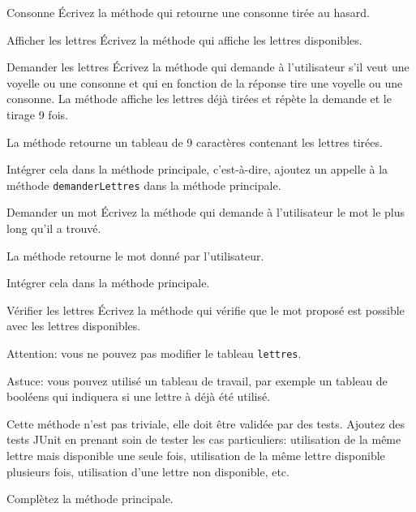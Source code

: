 \documentclass[a4paper,11pt]{article}
\begin{document}
 	\begin{Exercice}{Consonne}
		\'Ecrivez la méthode  qui retourne une consonne 
		tirée au hasard.
	\end{Exercice} 

 	\begin{Exercice}{Afficher les lettres}
 		\'Ecrivez la méthode 
		qui affiche les lettres disponibles.
	\end{Exercice} 

 	\begin{Exercice}{Demander les lettres}
		\'Ecrivez la méthode 
		qui demande à l'utilisateur s'il veut une voyelle ou une consonne
		et qui en fonction de la réponse tire une voyelle ou une consonne.
		La méthode affiche les lettres déjà tirées et répète la demande
		et le tirage 9 fois.
		 
		La méthode retourne un tableau de 9 caractères contenant les lettres tirées. 
		
		Intégrer cela dans la méthode principale, c'est-à-dire, ajoutez un appelle à 
		la méthode \texttt{demanderLettres} dans la méthode principale.
	\end{Exercice} 

	
 	\begin{Exercice}{Demander un mot}
		\'Ecrivez la méthode 
		qui demande à l'utilisateur le mot le plus long qu'il a trouvé.
		 
		La méthode retourne le mot donné par l'utilisateur. 
		
		Intégrer cela dans la méthode principale.
	\end{Exercice} 
	
 	\begin{Exercice}{Vérifier les lettres}
 			\'Ecrivez la méthode 
		qui vérifie que le mot proposé est possible avec les lettres 
		disponibles. 
		
		Attention: vous ne pouvez pas modifier le tableau \texttt{lettres}.
		
		Astuce: vous pouvez utilisé un tableau de travail, par exemple un 
		tableau de booléens qui indiquera si une lettre à déjà été utilisé.
		
		Cette méthode n'est pas triviale, elle doit être validée par des tests.
		Ajoutez des tests JUnit en prenant soin de tester les cas particuliers: 
		utilisation de la même lettre mais disponible une seule fois, utilisation de la 
		même lettre disponible plusieurs fois, utilisation d'une lettre non 
		disponible, etc.
		
		Complètez la méthode principale.
	\end{Exercice} 
	
\end{document}
